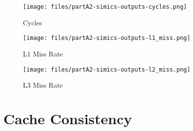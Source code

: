 \documentclass[a4paper,12pt]{article}
\begin{document}
\begin{figure}[H]
	\centering
    \texttt{[image: files/partA2-simics-outputs-cycles.png]}
	\caption{Cycles}
	\label{fig:B1}
\end{figure}

\begin{figure}[H]
	\centering
    \texttt{[image: files/partA2-simics-outputs-l1\_miss.png]}
    \caption{L1 Miss Rate}
	\label{fig:B2}
\end{figure}

\begin{figure}[H]
	\centering
    \texttt{[image: files/partA2-simics-outputs-l2\_miss.png]}
    \caption{L3 Miss Rate}
	\label{fig:B3}
\end{figure}




\section*{Cache Consistency}
\end{document}
